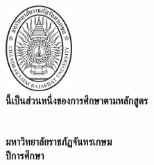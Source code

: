 \makeatletter
\clearpage\pagestyle{empty}
	{\centering
	\fontsize{16}{18.4}\selectfont
		\includegraphics[width=1in]{CRU_LOGO/CRU_Chandra}\\\vspace{\baselineskip}
		\bfseries\@thesistitleThai
	\vfill
	\fontsize{14}{16.1}\selectfont 
	\vspace{1.427465\baselineskip}
	\@authorThai
	\vfill
	 \@typeofwritingThai นี้เป็นส่วนหนึ่งของการศึกษาตามหลักสูตร\\
	\@degreeThai\\
	\ifdefined\@majorThai \@majorThai \ifdefined\@departmentThai\space\fi\fi \ifdefined\@departmentThai \@departmentThai\\ \fi
	\@facultyThai\space มหาวิทยาลัยราชภัฏจันทรเกษม\\
	ปีการศึกษา \the\year
	\par}


\cleardoublepage
\newpage


